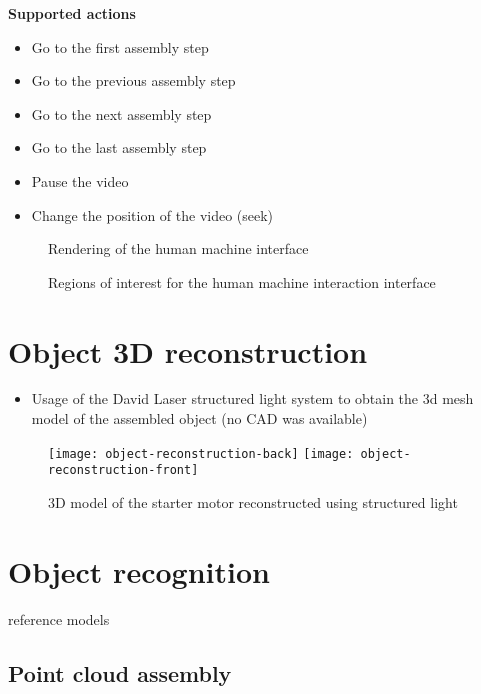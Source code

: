 \textbf{Supported actions}
\begin{itemize}
	\item Go to the first assembly step
	\item Go to the previous assembly step
	\item Go to the next assembly step
	\item Go to the last assembly step
	\item Pause the video
	\item Change the position of the video (seek)
\end{itemize}

\begin{figure}[H]
	\begin{floatrow}[2]
		{\caption{Rendering of the human machine interface}\label{fig:human-machine-interface}}
		{\caption{Regions of interest for the human machine interaction interface}\label{fig:interaction-rois}}
	\end{floatrow}
\end{figure}


\section{Object 3D reconstruction}

\begin{itemize}
	\item Usage of the David Laser structured light system to obtain the 3d mesh model of the assembled object (no CAD was available)
\end{itemize}

\begin{figure}[ht]
	\centering
	\texttt{[image: object-reconstruction-back]}
	\texttt{[image: object-reconstruction-front]}
	\caption{3D model of the starter motor reconstructed using structured light}
\end{figure}


\section{Object recognition}

reference models


\subsection{Point cloud assembly}

